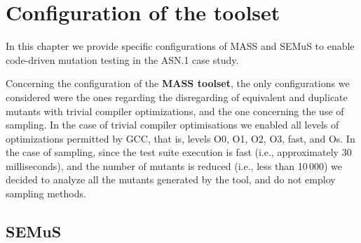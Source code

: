 
\chapter{Configuration of the toolset}

In this chapter we provide specific configurations of MASS and SEMuS to enable code-driven mutation testing in the ASN.1 case study.

Concerning the configuration of the \textbf{MASS toolset}, the only configurations we considered were the ones regarding the disregarding of equivalent and duplicate mutants with trivial compiler optimizations, and the one concerning the use of sampling.
In the case of trivial compiler optimisations we enabled all levels of optimizations permitted by GCC, that is, levels O0, O1, O2, O3, fast, and Os. 
In the case of sampling, since the test suite execution is fast (i.e., approximately 30 milliseconds), and the number of mutants is reduced (i.e., less than 10\,000) we decided to analyze all the mutants generated by the tool, and do not employ sampling methods. 



\section{SEMuS}

